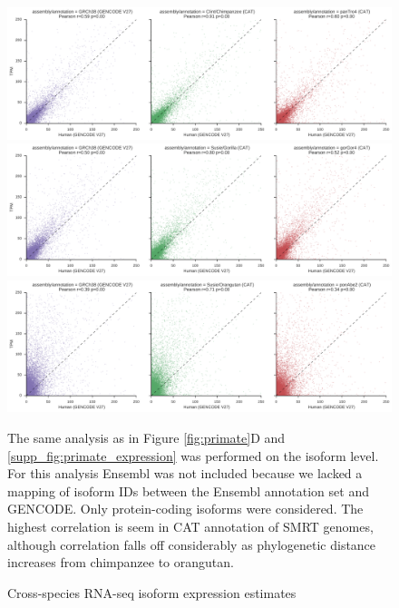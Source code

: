 \documentclass[fleqn,10pt]{wlscirep}
\begin{document}
\begin{figure}

\includegraphics[width=0.8\paperwidth,keepaspectratio]{chimp_kallisto_transcripts.pdf}

\includegraphics[width=0.8\paperwidth,keepaspectratio]{gorilla_kallisto_transcripts.pdf}

\includegraphics[width=0.8\paperwidth,keepaspectratio]{orangutan_kallisto_transcripts.pdf}

\caption{Cross-species RNA-seq isoform expression estimates}
The same analysis as in Figure \ref{fig:primate}D and \ref{supp_fig:primate_expression} was performed on the isoform level. For this analysis Ensembl was not included because we lacked a mapping of isoform IDs between the Ensembl annotation set and GENCODE. Only protein-coding isoforms were considered. The highest correlation is seem in CAT annotation of SMRT genomes, although correlation falls off considerably as phylogenetic distance increases from chimpanzee to orangutan.

\label{supp_fig:primate_transcript_expression}
\end{figure}
\end{document}
